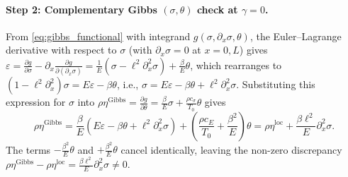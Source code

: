 \paragraph{Step 2: Complementary Gibbs $(\sigma,\theta)$ check at $\gamma = 0$.}
From \eqref{eq:gibbs_functional} with integrand $g(\sigma,\partial_x\sigma,\theta)$, the Euler--Lagrange derivative with respect to $\sigma$ (with $\partial_x\sigma = 0$ at $x=0,L$) gives $\varepsilon = \frac{\partial g}{\partial\sigma} - \partial_x\frac{\partial g}{\partial(\partial_x\sigma)} = \frac{1}{E}(\sigma - \ell^2\partial_x^2\sigma) + \frac{\beta}{E}\theta$, which rearranges to $(1-\ell^2\partial_x^2)\sigma = E\varepsilon - \beta\theta$, i.e., $\sigma = E\varepsilon - \beta\theta + \ell^2\partial_x^2\sigma$. Substituting this expression for $\sigma$ into $\rho\eta^{\mathrm{Gibbs}} = \frac{\partial g}{\partial\theta} = \frac{\beta}{E}\sigma + \frac{\rho c_\sigma}{T_0}\theta$ gives
\begin{equation}\label{eq:hc_gibbs}
  \rho\eta^{\mathrm{Gibbs}} = \frac{\beta}{E}\left(E\varepsilon - \beta\theta + \ell^2\partial_x^2\sigma\right) + \left(\frac{\rho c_E}{T_0} + \frac{\beta^2}{E}\right)\theta = \rho\eta^{\mathrm{loc}} + \frac{\beta\ell^2}{E}\partial_x^2\sigma.
\end{equation}
The terms $-\frac{\beta^2}{E}\theta$ and $+\frac{\beta^2}{E}\theta$ cancel identically, leaving the non-zero discrepancy $\rho\eta^{\mathrm{Gibbs}} - \rho\eta^{\mathrm{loc}} = \frac{\beta\ell^2}{E}\partial_x^2\sigma \neq 0$.


